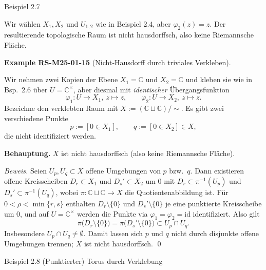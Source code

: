 \documentclass[10pt, letterpaper]{article}
\newcommand{\C}{\mathbb{C}}
\newcommand{\CustomHeading}[3]{%
  \par\medskip\noindent%
  \textbf{#1 #2} \textnormal{(#3)}.\enskip%
}
\newenvironment{EXA}[2]{\begin{unitbox}\CustomHeading{Example}{#1}{#2}}{\end{unitbox}}
\begin{document}
Beispiel 2.7 


Wir wählen $X_{1}, X_{2}$ und $U_{1,2}$ wie in Beispiel 2.4, aber $\varphi_{2}(z)=z$. Der resultierende topologische Raum ist nicht hausdorffsch, also keine Riemannsche Fläche.



\begin{EXA}{RS-M25-01-15}{Nicht‐Hausdorff durch triviales Verkleben}
Wir nehmen zwei Kopien der Ebene $X_1=\C$ und $X_2=\C$ und kleben sie wie in Bsp.~2.6
über $U=\C^\times$, aber diesmal mit \emph{identischer} Übergangsfunktion
\[
\varphi_1:U\to X_1,\ z\mapsto z,\qquad
\varphi_2:U\to X_2,\ z\mapsto z.
\]
Bezeichne den verklebten Raum mit $X:=(\C\sqcup\C)/\!\sim$. Es gibt zwei verschiedene Punkte
\[
p:=[0\in X_1],\qquad q:=[0\in X_2]\in X,
\]
die nicht identifiziert werden.

\textbf{Behauptung.} $X$ ist nicht hausdorffsch (also keine Riemannsche Fläche).

\textit{Beweis.}
Seien $U_p,U_q\subset X$ offene Umgebungen von $p$ bzw.\ $q$.
Dann existieren offene Kreisscheiben $D_r\subset X_1$ und $D_s'\subset X_2$ um $0$
mit $D_r\subset \pi^{-1}(U_p)$ und $D_s'\subset \pi^{-1}(U_q)$, wobei
$\pi:\C\sqcup\C\to X$ die Quotientenabbildung ist.
Für $0<\rho<\min\{r,s\}$ enthalten $D_r\setminus\{0\}$ und $D_s'\setminus\{0\}$ je
eine punktierte Kreisscheibe um $0$, und auf $U=\C^\times$ werden die Punkte via
$\varphi_1=\varphi_2=\mathrm{id}$ identifiziert. Also gilt
\[
\pi\big(D_r\setminus\{0\}\big)=\pi\big(D_s'\setminus\{0\}\big)\subset U_p\cap U_q.
\]
Insbesondere $U_p\cap U_q\neq\emptyset$. Damit lassen sich $p$ und $q$ nicht durch disjunkte
offene Umgebungen trennen; $X$ ist nicht hausdorffsch.
\qed
\end{EXA}




Beispiel 2.8  (Punktierter) Torus durch Verklebung
\end{document}
